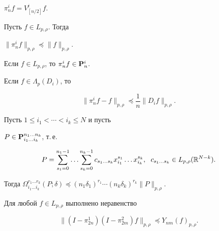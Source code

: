 $\pi^i_n f=V^i_{[n/2]}f$. 


 


\begin{lem} 


Пусть $f\in L_{p,\rho}$. Тогда 


$\|\pi^i_n f\|_{p,\rho}\preceq\|f\|_{p,\rho}$.


\end{lem} 


 


\begin{lem} 


Если $f\in L_{p,\rho}$, то $\pi^i_n f\in\bold P^i_n$. 


\end{lem} 


 


\begin{lem} 


Если $f\in\Lambda_p(D_i)$, то 


$$ 


\|\pi^i_n f-f\|_{p,\rho}\preceq\frac{1}{n} 


\|D_i f\|_{p,\rho}. 


$$ 


\end{lem} 


 


\begin{lem} 


Пусть $1\le i_1<\dotsb<i_k\le N$ и пусть 


$P\in\bold P^{n_1\dotsc n_k}_{i_1\dotsc i_k}$, т.\,е. 


$$ 


P=\sum^{n_1-1}_{s_1=0}\dotsc\sum^{n_k-1}_{s_k=0} 


c_{s_1\dotsc s_k}x^{s_1}_{i_1}\dotsc x^{s_k}_{i_k},\ \; 


c_{s_1\dotsc s_k}\in L_{p,\rho}(\Bbb R^{N-k}). 


$$ 


Тогда $\Omega^{r_1\dotsc r_k}_{i_1\dotsc i_k}(P;\delta)\preceq 


(n_1\delta_1)^{r_1}\dotsb(n_k\delta_k)^{r_k}\|P\|_{p,\rho}$. 


\end{lem} 


 


\begin{lem} 


Для любой $f\in L_{p,\rho}$ выполнено неравенство 


$$ 


\|(I-\pi^1_{2n})(I-\pi^2_{2m})f\|_{p,\rho}\preceq 


Y_{n m}(f)_{p,\rho}. 


$$ 


\end{lem} 


